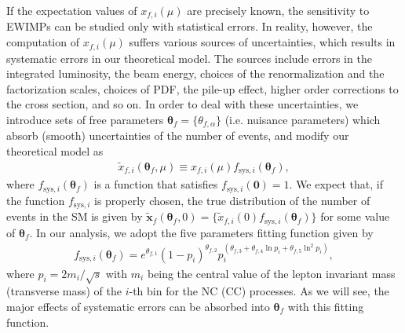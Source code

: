 \documentclass[12pt,twoside,book]{article}
\begin{document}
If the expectation values of $x_{f,i} (\mu)$ are precisely known, the
sensitivity to EWIMPs can be studied only with statistical errors.  In
reality, however, the computation of $x_{f,i} (\mu)$ suffers various
sources of uncertainties, which results in systematic errors in our
theoretical model.  The sources include errors in the integrated
luminosity, the beam energy, choices of the renormalization and the
factorization scales, choices of PDF, the pile-up effect, higher order
corrections to the cross section, and so on.  In order to deal with
these uncertainties, we introduce sets of free parameters $\bm{\theta}_f
= \{ \theta_{f,\alpha} \}$ (i.e. nuisance parameters) which absorb
(smooth) uncertainties of the number of events, and modify our
theoretical model as
\begin{align}
\tilde{x}_{f,i} (\bm{\theta}_f, \mu) \equiv x_{f,i} (\mu)
 f_{\mathrm{sys}, i}(\bm{\theta}_f),\label{eq_xtilde}
\end{align}
where $f_{\mathrm{sys}, i}(\bm{\theta}_f)$ is a function that satisfies
$f_{\mathrm{sys}, i}(\bm{0}) =1$.  We expect that, if the function
$f_{\mathrm{sys}, i}$ is properly chosen, the true distribution of the
number of events in the SM is given by $\tilde{\bm{x}}_f
(\bm{\theta}_f,0) = \{ \tilde{x}_{f,i} (0) f_{\mathrm{sys},
i}(\bm{\theta}_f)\}$ for some value of $\bm{\theta}_f$.  In our
analysis, we adopt the five parameters fitting function given
by~\cite{Aaltonen:2008dn}
\begin{align}
 f_{\mathrm{sys}, i} (\bm{\theta}_f) =
 e^{\theta_{f,1}} (1 - p_i)^{\theta_{f,2}}
 p_i^{(\theta_{f,3} + \theta_{f,4} \ln p_i + \theta_{f,5} \ln^2 p_i)},\label{eq_f_theta}
\end{align}
where $p_i = 2m_{i} / \sqrt{s}$ with $m_i$ being the central value of
the lepton invariant mass (transverse mass) of the $i$-th bin for the NC
(CC) processes.  As we will see, the major effects of systematic errors
can be absorbed into $\bm{\theta}_f$ with this fitting function.
\end{document}

